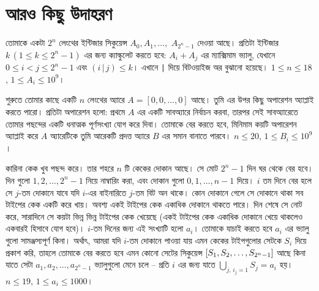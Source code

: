 
\section{আরও কিছু উদাহরণ}

\begin{example}
  তোমাকে একটা $2^n$ লেংথের ইন্টিজার সিকুয়েন্স $A_0, A_1, \ldots,$ $A_{2^n-1}$
  দেওয়া আছে। প্রতিটা ইন্টিজার $k \, (1 \le k \le 2^n-1)$ এর জন্য ক্যাল্কুলেট
  করতে হবে: $A_i + A_j$ এর ম্যাক্সিমাম ভ্যালু, যেখানে $0 \le i < j \le 2^n-1$
  এবং $(i \, \texttt{|} \, j) \le k$। এখানে \texttt{|} দিয়ে বিটওয়াইজ অর
  বুঝানো হয়েছে। $1 \le n \le 18$, $1 \le A_i \le 10^9$।
\end{example}
\begin{example}
  শুরুতে তোমার কাছে একটি $n$ লেংথের অ্যারে $A = [0, 0, \ldots, 0]$ আছে। তুমি
  এর উপর কিছু অপারেশন অ্যাপ্লাই করতে পারো। প্রতিটা অপারেশন হলো: প্রথমে $A$ এর
  একটি সাবঅ্যারে নির্বাচন করবা, তারপর সেই সাবঅ্যারেতে তোমার পছন্দের একটি
  ধনাত্মক পূর্ণসংখ্যা যোগ করে দিবা। তোমাকে বের করতে হবে, মিনিমাম কয়টি অপারেশন
  অ্যাপ্লাই করে $A$ অ্যারেটিকে তুমি আরেকটি প্রদত্ত অ্যারে $B$ এর সমান বানাতে
  পারবে। $n \le 20$, $1 \le B_i \le 10^9$।
\end{example}
\begin{example}
  কারিনা কেক খুব পছন্দ করে। তার শহরে $n$ টি কেকের দোকান আছে। সে মোট $2^n-1$
  দিন ঘর থেকে বের হবে। দিন গুলো $1, 2, \ldots, 2^{n}-1$ নিয়ে নাম্বারিং করা,
  এবং দোকান গুলো $0, 1, \ldots, n-1$ দিয়ে। $i$ তম দিনে বের হলে সে $j$-তম
  দোকানে যাবে যদি $i$-এর বাইনারিতে $j$-তম বিট অন থাকে। কোন দোকানে গেলে সে
  দোকানে থাকা সব টাইপের কেক একটি করে খায়। অবশ্য একই টাইপের কেক একাধিক দোকানে
  থাকতে পারে। দিন শেষে সে নোট করে, সারাদিনে সে কয়টা ভিন্ন ভিন্ন টাইপের কেক
  খেয়েছে (একই টাইপের কেক একাধিক দোকানে খেয়ে থাকলেও একবারই হিসাবে যোগ হবে)।
  $i$-তম দিনের জন্য এই সংখ্যাটি হলো $a_i$। তোমাকে যাচাই করতে হবে $a_i$ এর
  ভ্যালু গুলো সামঞ্জস্যপূর্ণ কিনা। অর্থাৎ, আমরা যদি $i$-তম দোকানে পাওয়া যায়
  এমন কেকের টাইপগুলোর সেটকে $S_i$ দিয়ে প্রকাশ করি, তাহলে তোমাকে বের করতে হবে
  এমন কোনো সেটের সিকুয়েন্স $\left [ S_1, S_2, \ldots, S_{2^n-1} \right ]$ আছে কিনা যাতে
  সেটা $a_1, a_2, \ldots, a_{2^n-1}$ ভ্যালুগুলো মেনে চলে -- প্রতি $i$ এর জন্য
  যাতে $\bigcup_{j,\, i_j = 1} S_j = a_i$ হয়। $n \le 19$, $1 \le a_i \le
  1000$।
\end{example}
